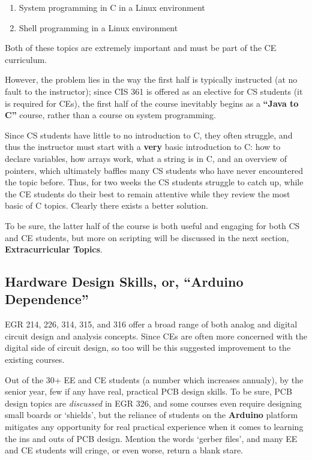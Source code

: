 \documentclass[12pt]{article}
\numberwithin{figure}{section}
\numberwithin{equation}{section}
\begin{document}
{\begin{enumerate}
\itemsep1pt\parskip0pt
\item System programming in C in a Linux environment
\item Shell programming in a Linux environment
\end{enumerate}

Both of these topics are extremely important and must be part of the CE
curriculum.

\bigskip

However, the problem lies in the way the first half is typically
instructed (at no fault to the instructor); since CIS 361 is offered as
an elective for CS students (it is required for CEs), the first half of
the course inevitably begins as a \textbf{``Java to C''} course, rather
than a course on system programming.

\bigskip

Since CS students have little to no introduction to C, they often
struggle, and thus the instructor must start with a \textbf{very} basic
introduction to C: how to declare variables, how arrays work, what a
string is in C, and an overview of pointers, which ultimately baffles
many CS students who have never encountered the topic before. Thus, for
two weeks the CS students struggle to catch up, while the CE students do
their best to remain attentive while they review the most basic of C
topics. Clearly there exists a better solution.

\bigskip

To be sure, the latter half of the course is both useful and engaging
for both CS and CE students, but more on scripting will be discussed in
the next section, \textbf{Extracurricular Topics}.

\subsection{Hardware Design Skills, or, ``Arduino Dependence''}\label{arduino-dependence}
EGR 214, 226, 314, 315, and 316 offer a broad range of both analog and
digital circuit design and analysis concepts. Since CEs are often more
concerned with the digital side of circuit design, so too will be this
suggested improvement to the existing courses.

\bigskip

Out of the 30+ EE and CE students (a number which increases annualy), by
the senior year, few if any have real, practical PCB design skills. To
be sure, PCB design topics are \emph{discussed} in EGR 326, and some
courses even require designing small boards or `shields', but the
reliance of students on the \textbf{Arduino} platform mitigates any
opportunity for real practical experience when it comes to learning the
ins and outs of PCB design. Mention the words `gerber files', and many
EE and CE students will cringe, or even worse, return a blank stare.

}
\end{document}

